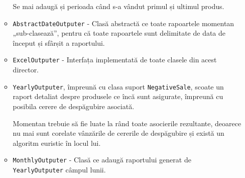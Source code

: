\begin{itemize}
\begin{itemize}
			Se mai adaugă și perioada când s-a vândut primul și ultimul produs.
			\item \verb|AbstractDateOutputer| - Clasă abstractă ce toate rapoartele momentan „sub-clasează”, pentru că toate rapoartele sunt delimitate de data de început și sfârșit a raportului.
			\item \verb|ExcelOutputer| - Interfața implementată de toate clasele din acest director.
			\item \verb|YearlyOutputer|, împreună cu clasa suport \verb|NegativeSale|, scoate un raport detaliat despre produsele ce încă sunt asigurate, împreună cu posibila cerere de despăgubire asociată.

			Momentan trebuie să fie luate la rând toate asocierile rezultante, deoarece nu mai sunt corelate vânzările de cererile de despăgubire și există un algoritm euristic în locul lui.
			\item \verb|MonthlyOutputer| - Clasă ce adaugă raportului generat de \\
			\verb|YearlyOutputer| câmpul lunii.
		\end{itemize}
	\end{itemize}

